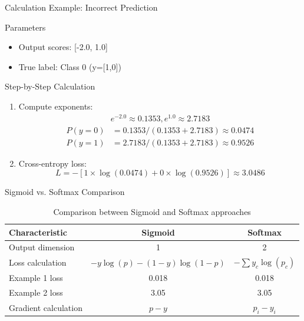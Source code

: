 \documentclass{beamer}
\begin{document}
	\begin{frame}{Calculation Example: Incorrect Prediction}
		\begin{block}{Parameters}
			\begin{itemize}
				\item Output scores: [-2.0, 1.0]
				\item True label: Class 0 (y=[1,0])
			\end{itemize}
		\end{block}
		
		\begin{exampleblock}{Step-by-Step Calculation}
			\begin{enumerate}
				\item Compute exponents:
				\begin{align*}
					e^{-2.0} \approx 0.1353,
					e^{1.0} \approx 2.7183
				\end{align*}
				\begin{align*}
					P(y=0) &= {0.1353}/({0.1353 + 2.7183}) \approx 0.0474 \\
					P(y=1) &= {2.7183}/{(0.1353 + 2.7183)} \approx 0.9526
				\end{align*}
				
				\item Cross-entropy loss:
				\[
				L = -[1\times\log(0.0474) + 0\times\log(0.9526)] \approx 3.0486
				\]
			\end{enumerate}
		\end{exampleblock}
	\end{frame}
	
	\begin{frame}{Sigmoid vs. Softmax Comparison}
		\begin{table}
			\centering
			\begin{tabular}{lcc}
				\toprule
				\textbf{Characteristic} & \textbf{Sigmoid} & \textbf{Softmax} \\
				\midrule
				Output dimension & 1 & 2 \\
				Loss calculation & $-y\log(p)-(1-y)\log(1-p)$ & $-\sum y_c\log(p_c)$ \\
				Example 1 loss & 0.018 & 0.018 \\
				Example 2 loss & 3.05 & 3.05 \\
				Gradient calculation & $p - y$ & $p_i - y_i$ \\
				\bottomrule
			\end{tabular}
			\caption{Comparison between Sigmoid and Softmax approaches}
		\end{table}
	\end{frame}
	
\end{document}
